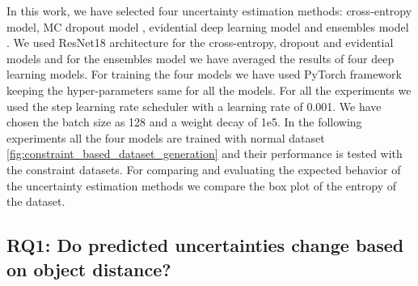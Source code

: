   In this work, we have selected four uncertainty estimation methods: cross-entropy model, MC dropout model \cite{gal2016dropout}, evidential deep learning model \cite{sensoy2018evidential} and ensembles model \cite{lakshminarayanan2017simple}. We used ResNet18 architecture for the cross-entropy, dropout and evidential models and for the ensembles model we have averaged the results of four deep learning models. For training the four models we have used PyTorch framework keeping the hyper-parameters same for all the models. For all the experiments we used the step learning rate scheduler with a learning rate of 0.001. We have chosen the batch size as 128 and a weight decay of 1e5. In the following experiments all the four models are trained with normal dataset 
 \ref{fig:constraint_based_dataset_generation} and their performance is tested with the constraint datasets. For comparing and evaluating the expected behavior of the uncertainty estimation methods we compare the box plot of the entropy of the dataset. 

\subsection{RQ1: Do predicted uncertainties change based on object distance?}

